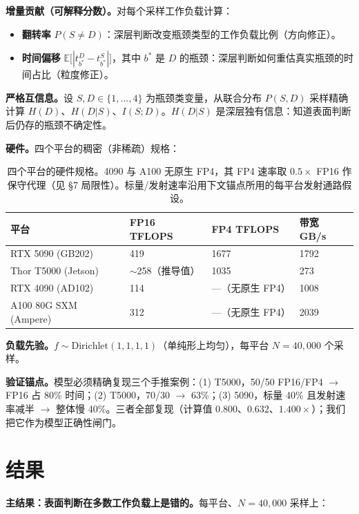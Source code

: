 \documentclass[12pt]{ctexart}
\begin{document}
\textbf{增量贡献（可解释分数）。}对每个采样工作负载计算：
\begin{itemize}
  \item \textbf{翻转率} $P(S \neq D)$：深层判断改变瓶颈类型的工作负载比例（方向修正）。
  \item \textbf{时间偏移} $\mathbb{E}\big[|t^{D}_{b^{*}} - t^{S}_{b^{*}}|\big]$，其中 $b^{*}$ 是 $D$ 的瓶颈：深层判断如何重估真实瓶颈的时间占比（粒度修正）。
\end{itemize}

\textbf{严格互信息。}设 $S, D \in \{1,\dots,4\}$ 为瓶颈类变量，从联合分布 $P(S,D)$ 采样精确计算 $H(D)$、$H(D|S)$、$I(S;D)$。$H(D|S)$ 是深层独有信息：知道表面判断后仍存的瓶颈不确定性。

\textbf{硬件。}四个平台的稠密（非稀疏）规格：

\begin{table}[t]
\centering
\begin{tabular}{@{}llll@{}}
\toprule
平台 & FP16 TFLOPS & FP4 TFLOPS & 带宽 GB/s \\
\midrule
RTX 5090 (GB202) & 419 & 1677 & 1792 \\
Thor T5000 (Jetson) & $\sim$258（推导值） & 1035 & 273 \\
RTX 4090 (AD102) & 114 & ---（无原生 FP4） & 1008 \\
A100 80G SXM (Ampere) & 312 & ---（无原生 FP4） & 2039 \\
\bottomrule
\end{tabular}
\caption{四个平台的硬件规格。4090 与 A100 无原生 FP4，其 FP4 速率取 $0.5 \times$ FP16 作保守代理（见 §7 局限性）。标量/发射速率沿用下文锚点所用的每平台发射通路假设。}
\label{tab:hw}
\end{table}

\textbf{负载先验。}$f \sim \text{Dirichlet}(1,1,1,1)$（单纯形上均匀），每平台 $N = 40{,}000$ 个采样。

\textbf{验证锚点。}模型必须精确复现三个手推案例：(1) T5000，50/50 FP16/FP4 $\to$ FP16 占 80\% 时间；(2) T5000，70/30 $\to$ 63\%；(3) 5090，标量 40\% 且发射速率减半 $\to$ 整体慢 40\%。三者全部复现（计算值 0.800、0.632、$1.400\times$）；我们把它作为模型正确性闸门。

\section{结果}\label{results}

\textbf{主结果：表面判断在多数工作负载上是错的。}每平台、$N=40{,}000$ 采样上：
\end{document}
